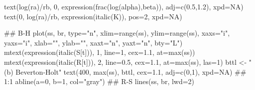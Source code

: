 \documentclass[
  11pt,
]{article}
\newenvironment{Shaded}{}{}
\newcommand{\AttributeTok}[1]{#1}
\newcommand{\ConstantTok}[1]{#1}
\newcommand{\DecValTok}[1]{#1}
\newcommand{\DocumentationTok}[1]{\textcolor[rgb]{0.00,0.50,0.00}{#1}}
\newcommand{\FloatTok}[1]{#1}
\newcommand{\FunctionTok}[1]{#1}
\newcommand{\NormalTok}[1]{#1}
\newcommand{\OtherTok}[1]{\textcolor[rgb]{1.00,0.25,0.00}{#1}}
\newcommand{\SpecialCharTok}[1]{\textcolor[rgb]{0.00,0.50,0.50}{#1}}
\newcommand{\StringTok}[1]{\textcolor[rgb]{0.00,0.50,0.50}{#1}}
\begin{document}
\begin{Shaded}
\begin{Highlighting}[]
\FunctionTok{text}\NormalTok{(}\FunctionTok{log}\NormalTok{(ra)}\SpecialCharTok{/}\NormalTok{rb, }\DecValTok{0}\NormalTok{, }\FunctionTok{expression}\NormalTok{(}\FunctionTok{frac}\NormalTok{(}\FunctionTok{log}\NormalTok{(alpha),beta)), }\AttributeTok{adj=}\FunctionTok{c}\NormalTok{(}\FloatTok{0.5}\NormalTok{,}\FloatTok{1.2}\NormalTok{), }\AttributeTok{xpd=}\ConstantTok{NA}\NormalTok{)}
\FunctionTok{text}\NormalTok{(}\DecValTok{0}\NormalTok{, }\FunctionTok{log}\NormalTok{(ra)}\SpecialCharTok{/}\NormalTok{rb, }\FunctionTok{expression}\NormalTok{(}\FunctionTok{italic}\NormalTok{(K)), }\AttributeTok{pos=}\DecValTok{2}\NormalTok{, }\AttributeTok{xpd=}\ConstantTok{NA}\NormalTok{)}

\DocumentationTok{\#\# B{-}H}
\FunctionTok{plot}\NormalTok{(ss, br, }\AttributeTok{type=}\StringTok{"n"}\NormalTok{, }\AttributeTok{xlim=}\FunctionTok{range}\NormalTok{(ss), }\AttributeTok{ylim=}\FunctionTok{range}\NormalTok{(ss), }\AttributeTok{xaxs=}\StringTok{"i"}\NormalTok{, }\AttributeTok{yaxs=}\StringTok{"i"}\NormalTok{,}
     \AttributeTok{xlab=}\StringTok{""}\NormalTok{, }\AttributeTok{ylab=}\StringTok{""}\NormalTok{, }\AttributeTok{xaxt=}\StringTok{"n"}\NormalTok{, }\AttributeTok{yaxt=}\StringTok{"n"}\NormalTok{, }\AttributeTok{bty=}\StringTok{"L"}\NormalTok{)}
\FunctionTok{mtext}\NormalTok{(}\FunctionTok{expression}\NormalTok{(}\FunctionTok{italic}\NormalTok{(S[t])), }\DecValTok{1}\NormalTok{, }\AttributeTok{line=}\DecValTok{1}\NormalTok{, }\AttributeTok{cex=}\FloatTok{1.1}\NormalTok{, }\AttributeTok{at=}\FunctionTok{max}\NormalTok{(ss))}
\FunctionTok{mtext}\NormalTok{(}\FunctionTok{expression}\NormalTok{(}\FunctionTok{italic}\NormalTok{(R[t])), }\DecValTok{2}\NormalTok{, }\AttributeTok{line=}\FloatTok{0.5}\NormalTok{, }\AttributeTok{cex=}\FloatTok{1.1}\NormalTok{, }\AttributeTok{at=}\FunctionTok{max}\NormalTok{(ss), }\AttributeTok{las=}\DecValTok{1}\NormalTok{)}
\NormalTok{bttl }\OtherTok{\textless{}{-}} \StringTok{"(b) Beverton{-}Holt"}
\FunctionTok{text}\NormalTok{(}\DecValTok{400}\NormalTok{, }\FunctionTok{max}\NormalTok{(ss), bttl, }\AttributeTok{cex=}\FloatTok{1.1}\NormalTok{, }\AttributeTok{adj=}\FunctionTok{c}\NormalTok{(}\DecValTok{0}\NormalTok{,}\DecValTok{1}\NormalTok{), }\AttributeTok{xpd=}\ConstantTok{NA}\NormalTok{)}
\DocumentationTok{\#\# 1:1}
\FunctionTok{abline}\NormalTok{(}\AttributeTok{a=}\DecValTok{0}\NormalTok{, }\AttributeTok{b=}\DecValTok{1}\NormalTok{, }\AttributeTok{col=}\StringTok{"gray"}\NormalTok{)}
\DocumentationTok{\#\# R{-}S}
\FunctionTok{lines}\NormalTok{(ss, br, }\AttributeTok{lwd=}\DecValTok{2}\NormalTok{)}

\end{Highlighting}
\end{Shaded}
\end{document}
